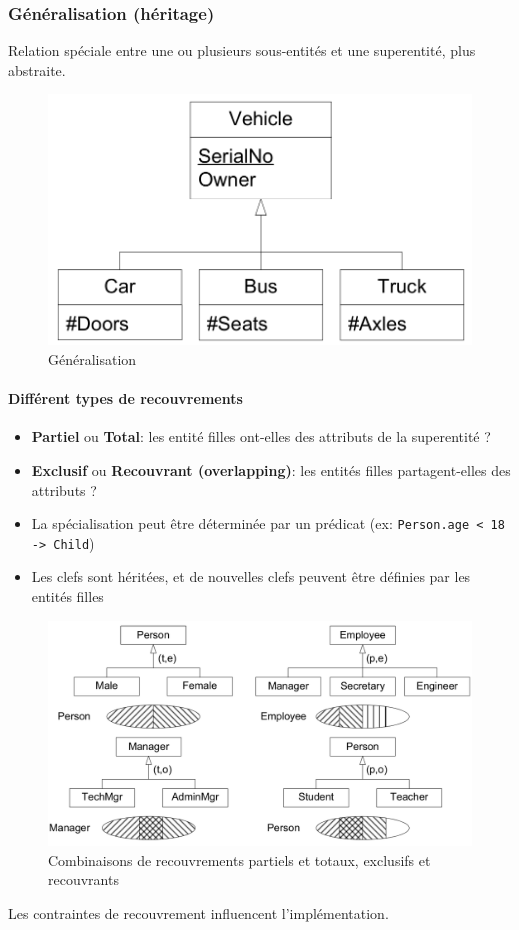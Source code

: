 \documentclass[a4paper]{article}
\begin{document}
\subsubsection{Généralisation (héritage)}
Relation spéciale entre une ou plusieurs sous-entités et une superentité, plus abstraite.

\begin{figure}[h!]
    \center
    \includegraphics[width=.3\textwidth]{fig/generalisation.png}
    \caption{Généralisation}
\end{figure}

\paragraph{Différent types de recouvrements}
\begin{itemize}
  \item \textbf{Partiel} ou \textbf{Total}: les entité filles ont-elles des attributs de la superentité ?
  \item \textbf{Exclusif} ou \textbf{Recouvrant (overlapping)}: les entités filles partagent-elles des attributs ?
  \item La spécialisation peut être déterminée par un prédicat (ex: \texttt{Person.age < 18 -> Child})
  \item Les clefs sont héritées, et de nouvelles clefs peuvent être définies par les entités filles
\end{itemize}
\begin{figure}[h!]
    \center
    \includegraphics[width=.6\textwidth]{fig/generalisation-cov.png}
    \caption{Combinaisons de recouvrements partiels et totaux, exclusifs et recouvrants}
\end{figure}

Les contraintes de recouvrement influencent l'implémentation.
\end{document}
